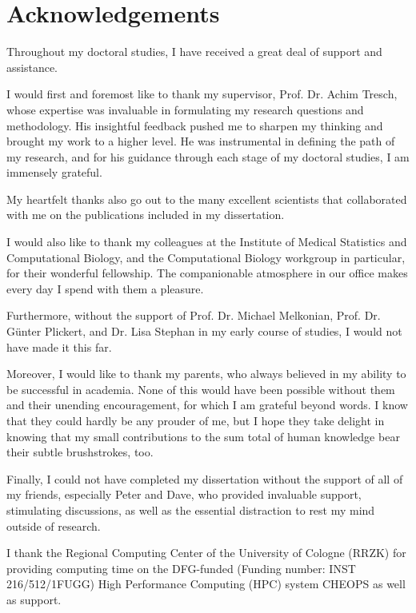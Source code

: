 \chapter*{Acknowledgements}

Throughout my doctoral studies, I have received a great deal of support and
assistance.

\bigbreak
\noindent I would first and foremost like to thank my supervisor, Prof. Dr.
Achim Tresch, whose expertise was invaluable in formulating my research
questions and methodology. His insightful feedback pushed me to sharpen my
thinking and brought my work to a higher level. He was instrumental in
defining the path of my research, and for his guidance through each stage of
my doctoral studies, I am immensely grateful.

\bigbreak
\noindent My heartfelt thanks also go out to the many excellent scientists
that collaborated with me on the publications included in my dissertation.

\bigbreak
\noindent I would also like to thank my colleagues at the Institute of Medical
Statistics and Computational Biology, and the Computational Biology workgroup
in particular, for their wonderful fellowship. The companionable atmosphere in
our office makes every day I spend with them a pleasure.

\bigbreak
\noindent Furthermore, without the support of Prof. Dr. Michael Melkonian,
Prof. Dr. Günter Plickert, and Dr. Lisa Stephan in my early course of
studies, I would not have made it this far.

\bigbreak
\noindent Moreover, I would like to thank my parents, who always believed in
my ability to be successful in academia. None of this would have been possible
without them and their unending encouragement, for which I am grateful beyond
words. I know that they could hardly be any prouder of me, but I hope they
take delight in knowing that my small contributions to the sum total of human
knowledge bear their subtle brushstrokes, too.

\bigbreak
\noindent Finally, I could not have completed my dissertation without the
support of all of my friends, especially Peter and Dave, who provided
invaluable support, stimulating discussions, as well as the essential
distraction to rest my mind outside of research.


\newpage\null\vfill
{}
\noindent I thank the Regional Computing Center of the University of Cologne
(RRZK) for providing computing time on the DFG-funded (Funding number: INST
216\thinspace{}/\thinspace{}512\thinspace{}/\thinspace{}1FUGG) High
Performance Computing (HPC) system CHEOPS as well as support.
